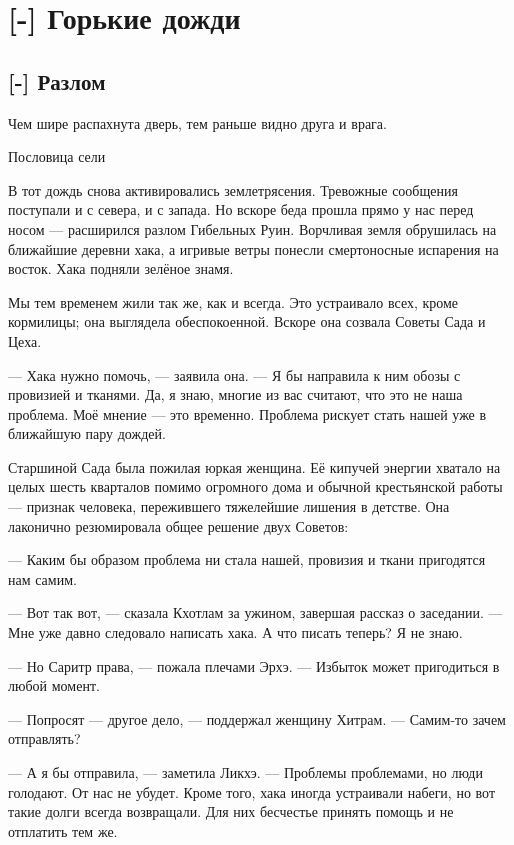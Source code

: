 \chapter{[-] Горькие дожди}

\section{[-] Разлом}

\epigraph
{Чем шире распахнута дверь, тем раньше видно друга и врага.}
{Пословица сели}

\textspace

В тот дождь снова активировались землетрясения.
Тревожные сообщения поступали и с севера, и с запада.
Но вскоре беда прошла прямо у нас перед носом --- расширился разлом Гибельных Руин.
Ворчливая земля обрушилась на ближайшие деревни хака, а игривые ветры понесли смертоносные испарения на восток.
Хака подняли зелёное знамя\FM.

Мы тем временем жили так же, как и всегда.
Это устраивало всех, кроме кормилицы;
она выглядела обеспокоенной.
Вскоре она созвала Советы Сада и Цеха.

--- Хака нужно помочь, --- заявила она.
--- Я бы направила к ним обозы с провизией и тканями.
Да, я знаю, многие из вас считают, что это не наша проблема.
Моё мнение --- это временно.
Проблема рискует стать нашей уже в ближайшую пару дождей.

Старшиной Сада была пожилая юркая женщина.
Её кипучей энергии хватало на целых шесть кварталов помимо огромного дома и обычной крестьянской работы --- признак человека, пережившего тяжелейшие лишения в детстве.
Она лаконично резюмировала общее решение двух Советов:

--- Каким бы образом проблема ни стала нашей, провизия и ткани пригодятся нам самим.

--- Вот так вот, --- сказала Кхотлам за ужином, завершая рассказ о заседании.
--- Мне уже давно следовало написать хака.
А что писать теперь?
Я не знаю.

--- Но Саритр права, --- пожала плечами Эрхэ.
--- Избыток может пригодиться в любой момент.

--- Попросят --- другое дело, --- поддержал женщину Хитрам.
--- Самим-то зачем отправлять?

--- А я бы отправила, --- заметила Ликхэ.
--- Проблемы проблемами, но люди голодают.
От нас не убудет.
Кроме того, хака иногда устраивали набеги, но вот такие долги всегда возвращали.
Для них бесчестье принять помощь и не отплатить тем же.

